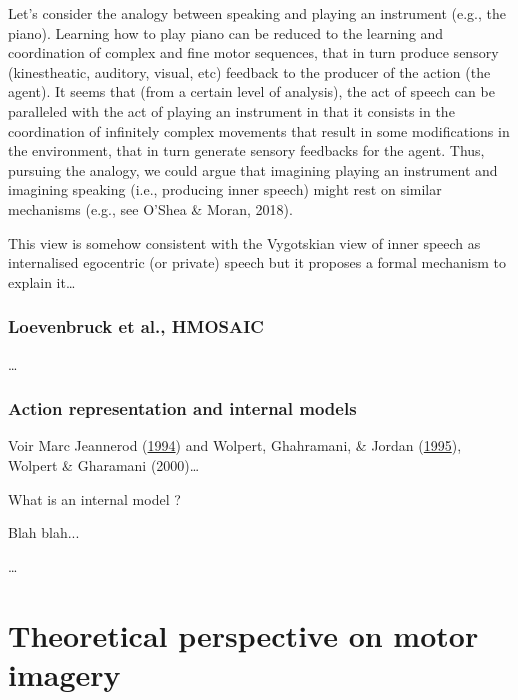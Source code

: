 \documentclass[a4paper,12pt,twoside,openright,oldfontcommands]{memoir}
\begin{document}
Let's consider the analogy between speaking and playing an instrument
(e.g., the piano). Learning how to play piano can be reduced to the
learning and coordination of complex and fine motor sequences, that in
turn produce sensory (kinestheatic, auditory, visual, etc) feedback to
the producer of the action (the agent). It seems that (from a certain
level of analysis), the act of speech can be paralleled with the act of
playing an instrument in that it consists in the coordination of
infinitely complex movements that result in some modifications in the
environment, that in turn generate sensory feedbacks for the agent.
Thus, pursuing the analogy, we could argue that imagining playing an
instrument and imagining speaking (i.e., producing inner speech) might
rest on similar mechanisms (e.g., see O'Shea \& Moran, 2018).

This view is somehow consistent with the Vygotskian view of inner speech
as internalised egocentric (or private) speech but it proposes a formal
mechanism to explain it\ldots{}

\subsubsection{Loevenbruck et al.,
HMOSAIC}\label{loevenbruck-et-al.-hmosaic}

\ldots{}

\subsubsection{Action representation and internal
models}\label{action-representation-and-internal-models}

Voir Marc Jeannerod
(\protect\hyperlink{ref-jeannerod_representing_1994}{1994}) and Wolpert,
Ghahramani, \& Jordan
(\protect\hyperlink{ref-wolpert_internal_1995}{1995}), Wolpert \&
Gharamani (2000)\ldots{}

\vspace{2mm}

\begin{mybox}[label = model]{What is an internal model ?}

Blah blah...

\end{mybox}

\ldots{}

\section{Theoretical perspective on motor
imagery}\label{theoretical-perspective-on-motor-imagery}
\end{document}
